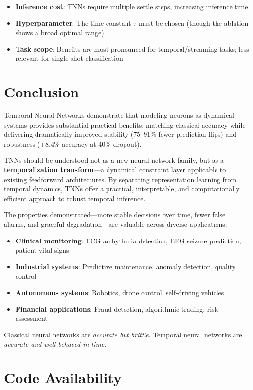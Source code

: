 \documentclass[11pt]{article}
\begin{document}
\begin{itemize}
    \item \textbf{Inference cost}: TNNs require multiple settle steps, increasing inference time
    \item \textbf{Hyperparameter}: The time constant $\tau$ must be chosen (though the ablation shows a broad optimal range)
    \item \textbf{Task scope}: Benefits are most pronounced for temporal/streaming tasks; less relevant for single-shot classification
\end{itemize}

\section{Conclusion}

Temporal Neural Networks demonstrate that modeling neurons as dynamical systems provides substantial practical benefits: matching classical accuracy while delivering dramatically improved stability (75--91\% fewer prediction flips) and robustness (+8.4\% accuracy at 40\% dropout).

TNNs should be understood not as a new neural network family, but as a \textbf{temporalization transform}---a dynamical constraint layer applicable to existing feedforward architectures. By separating representation learning from temporal dynamics, TNNs offer a practical, interpretable, and computationally efficient approach to robust temporal inference.

The properties demonstrated---more stable decisions over time, fewer false alarms, and graceful degradation---are valuable across diverse applications:
\begin{itemize}
    \item \textbf{Clinical monitoring}: ECG arrhythmia detection, EEG seizure prediction, patient vital signs
    \item \textbf{Industrial systems}: Predictive maintenance, anomaly detection, quality control
    \item \textbf{Autonomous systems}: Robotics, drone control, self-driving vehicles
    \item \textbf{Financial applications}: Fraud detection, algorithmic trading, risk assessment
\end{itemize}

Classical neural networks are \emph{accurate but brittle}. Temporal neural networks are \emph{accurate and well-behaved in time}.

\section*{Code Availability}
\end{document}
